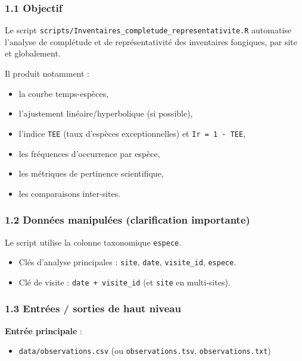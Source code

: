 \subsubsection{1.1 Objectif}\label{objectif}

Le script \texttt{scripts/Inventaires\_completude\_representativite.R}
automatise l'analyse de complétude et de représentativité des
inventaires fongiques, par site et globalement.

Il produit notamment :

\begin{itemize}
\tightlist
\item
  la courbe temps-espèces,
\item
  l'ajustement linéaire/hyperbolique (si possible),
\item
  l'indice \texttt{TEE} (taux d'espèces exceptionnelles) et
  \texttt{Ir\ =\ 1\ -\ TEE},
\item
  les fréquences d'occurrence par espèce,
\item
  les métriques de pertinence scientifique,
\item
  les comparaisons inter-sites.
\end{itemize}

\subsubsection{1.2 Données manipulées (clarification
importante)}\label{donnuxe9es-manipuluxe9es-clarification-importante}

Le script utilise la colonne taxonomique \texttt{espece}.

\begin{itemize}
\tightlist
\item
  Clés d'analyse principales : \texttt{site}, \texttt{date},
  \texttt{visite\_id}, \texttt{espece}.
\item
  Clé de visite : \texttt{date\ +\ visite\_id} (et \texttt{site} en
  multi-sites).
\end{itemize}

\subsubsection{1.3 Entrées / sorties de haut
niveau}\label{entruxe9es-sorties-de-haut-niveau}

\textbf{Entrée principale} :

\begin{itemize}
\tightlist
\item
  \texttt{data/observations.csv} (ou \texttt{observations.tsv},
  \texttt{observations.txt})
\end{itemize}

